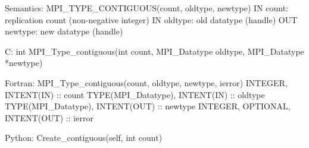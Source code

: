 Semantics:
MPI_TYPE_CONTIGUOUS(count, oldtype, newtype)
IN count: replication count (non-negative integer)
IN oldtype: old datatype (handle)
OUT newtype: new datatype (handle)

C:
int MPI_Type_contiguous(int count, MPI_Datatype oldtype, MPI_Datatype *newtype)

Fortran:
MPI_Type_contiguous(count, oldtype, newtype, ierror)
INTEGER, INTENT(IN) :: count
TYPE(MPI_Datatype), INTENT(IN) :: oldtype
TYPE(MPI_Datatype), INTENT(OUT) :: newtype
INTEGER, OPTIONAL, INTENT(OUT) :: ierror

Python:
Create_contiguous(self, int count)
